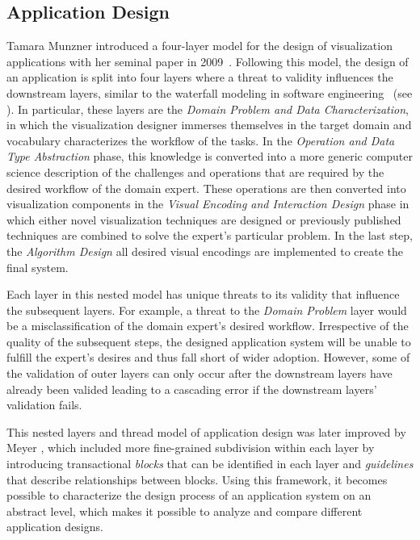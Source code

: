 \subsection{Application Design} \label{cha:intro:appl:design}
Tamara Munzner introduced a four-layer model for the design of visualization applications with her seminal paper in 2009~\cite{munzner2009nested}.  Following this model, the design of an application is split into four layers where a threat to validity influences the downstream layers, similar to the waterfall modeling in software engineering~\cite{royce1987managing} (see ).  In particular, these layers are the \emph{Domain Problem and Data Characterization}, in which the visualization designer immerses themselves in the target domain and vocabulary characterizes the workflow of the tasks.  In the \emph{Operation and Data Type Abstraction} phase, this knowledge is converted into a more generic computer science description of the challenges and operations that are required by the desired workflow of the domain expert.  These operations are then converted into visualization components in the \emph{Visual Encoding and Interaction Design} phase in which either novel visualization techniques are designed or previously published techniques are combined to solve the expert's particular problem.  In the last step, the \emph{Algorithm Design} all desired visual encodings are implemented to create the final system.

Each layer in this nested model has unique threats to its validity that influence the subsequent layers.  For example, a threat to the \emph{Domain Problem} layer would be a misclassification of the domain expert's desired workflow.  Irrespective of the quality of the subsequent steps, the designed application system will be unable to fulfill the expert's desires and thus fall short of wider adoption.  However, some of the validation of outer layers can only occur after the downstream layers have already been valided leading to a cascading error if the downstream layers' validation fails.

This nested layers and thread model of application design was later improved by Meyer \etal , which included more fine-grained subdivision within each layer by introducing transactional \emph{blocks} that can be identified in each layer and \emph{guidelines} that describe relationships between blocks.  Using this framework, it becomes possible to characterize the design process of an application system on an abstract level, which makes it possible to analyze and compare different application designs.


